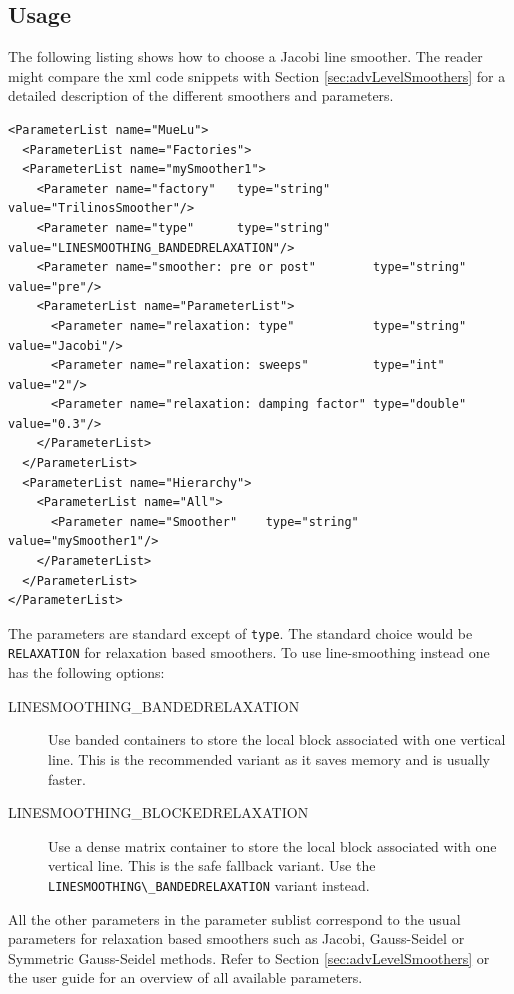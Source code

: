\documentclass[10pt,fleqn]{book}
\begin{document}
\subsection{Usage}

The following listing shows how to choose a Jacobi line smoother. The reader might compare the xml code snippets with Section \ref{sec:advLevelSmoothers} for a detailed description of the different smoothers and parameters.

\begin{lstlisting}
<ParameterList name="MueLu">
  <ParameterList name="Factories">
  <ParameterList name="mySmoother1">
    <Parameter name="factory"   type="string" value="TrilinosSmoother"/>
    <Parameter name="type"      type="string" value="LINESMOOTHING_BANDEDRELAXATION"/>
    <Parameter name="smoother: pre or post"        type="string" value="pre"/>
    <ParameterList name="ParameterList">
      <Parameter name="relaxation: type"           type="string" value="Jacobi"/>
      <Parameter name="relaxation: sweeps"         type="int"    value="2"/>
      <Parameter name="relaxation: damping factor" type="double" value="0.3"/>
    </ParameterList>
  </ParameterList>
  <ParameterList name="Hierarchy">
    <ParameterList name="All">
      <Parameter name="Smoother"    type="string"   value="mySmoother1"/>
    </ParameterList>
  </ParameterList>
</ParameterList>
\end{lstlisting}

The parameters are standard except of \verb|type|. The standard choice would be \verb|RELAXATION| for relaxation based smoothers. To use line-smoothing instead one has the following options:

\begin{description}
\item [LINESMOOTHING\_BANDEDRELAXATION] Use banded containers to store the local block associated with one vertical line. This is the recommended variant as it saves memory and is usually faster.
\item [LINESMOOTHING\_BLOCKEDRELAXATION] Use a dense matrix container to store the local block associated with one vertical line. This is the safe fallback variant. Use the \verb|LINESMOOTHING\_BANDEDRELAXATION| variant instead.
\end{description}

All the other parameters in the parameter sublist correspond to the usual parameters for relaxation based smoothers such as Jacobi, Gauss-Seidel or Symmetric Gauss-Seidel methods. Refer to Section \ref{sec:advLevelSmoothers} or the \muelu user guide \cite{Mue} for an overview of all available parameters.
\end{document}
